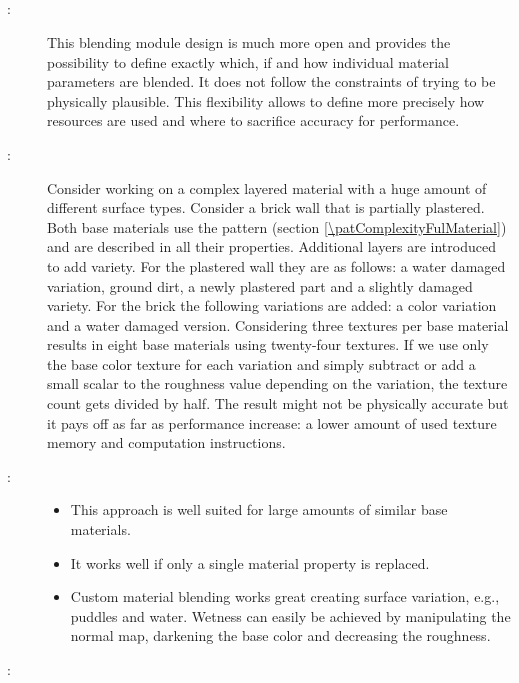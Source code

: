 \subsection{\patBlendingPartially}\label{\patBlendingPartially}
\begin{description}
	\item[\patIntent:]%
	This blending module design is much more open and provides the possibility to define exactly which, if and how individual material parameters are blended. It does not follow the constraints of trying to be physically plausible. This flexibility allows to define more precisely how resources are used and where to sacrifice accuracy for performance.
	\item[\patMotivation:]%
	Consider working on a complex layered material with a huge amount of different surface types. Consider a brick wall that is partially plastered. Both base materials use the pattern \emph{\patComplexityFulMaterial} (section \ref{\patComplexityFulMaterial}) and are described in all their properties. Additional layers are introduced to add variety. For the plastered wall they are as follows: a water damaged variation, ground dirt, a newly plastered part and a slightly damaged variety. For the brick the following variations are added: a color variation and a water damaged version. Considering three textures per base material results in eight base materials using twenty-four textures. If we use only the base color texture for each variation and simply subtract or add a small scalar to the roughness value depending on the variation, the texture count gets divided by half. The result might not be physically accurate but it pays off as far as performance increase: a lower amount of used texture memory and computation instructions.
	\item[\patApplicability:]\hfill
	\begin{itemize}\mynobreakpar
		\item This approach is well suited for large amounts of similar base materials.
		\item It works well if only a single  material property is replaced.
		\item Custom material blending works great creating surface variation, e.g., puddles and water. Wetness can easily be achieved by manipulating the normal map, darkening the base color and decreasing the roughness. 
	\end{itemize}
	\item[\patImplementation:]%

\end{description}
